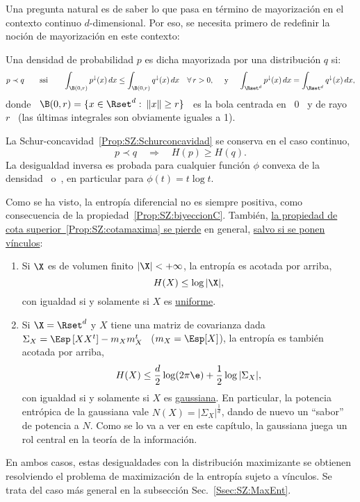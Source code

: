 Una pregunta natural  es de saber lo que pasa en  t\'ermino de mayorizaci\'on en
el contexto continuo $d$-dimensional. Por  eso, se necesita primero de redefinir
la noci\'on de mayorizaci\'on en este contexto:
%
\begin{definicion}\label{Def:SZ:MayorizacionC}
  Una densidad  de probabilidad $p$  es dicha mayorizada por  una distribuci\'on
  $q$ si:
  \[
  p \prec  q \qquad \mbox{ssi}  \qquad \int_{\B(0,r)} p^\downarrow(x) \,  dx \le
  \int_{\B(0,r)} q^\downarrow(x) \, dx \quad \forall  \, r > 0, \quad \mbox{ y }
  \quad \int_{\Rset^d} p^\downarrow(x) \, dx = \int_{\Rset^d} q^\downarrow(x) \,
  dx,
  \]
  donde \ $\B(0,r) = \{ x \in \Rset^d:  \: \|x\| \ge r \}$ \ es la bola centrada
  en \ $0$ \ y de rayo  \ $r$ \ (las \'ultimas integrales son obviamente iguales
  a 1).
\end{definicion}
%
\noindent  La Schur-concavidad~\ref{Prop:SZ:Schurconcavidad}  se conserva  en el
caso  continuo, \ie
%
\[
p \prec  q  \quad \Rightarrow  \quad H(p)  \ge H(q).
\]
%
La desigualdad inversa es probada  para cualquier funci\'on $\phi$ convexa de la
densidad~\cite{Cho74} o~\cite[Prop.~7.3]{WanMad04},  en particular para $\phi(t)
= t \log t$.

Como  se  ha visto,  la  entrop\'ia diferencial  no  es  siempre positiva,  como
consecuencia de la propiedad~\ref{Prop:SZ:biyeccionC}.  Tambi\'en, \underline{la
  propiedad  de cota  superior~\ref{Prop:SZ:cotamaxima} se  pierde}  en general,
\underline{salvo si se ponen v\'inculos}:
%
\begin{propiedadesC}\setcounter{enumi}{\value{PropCotamaxima}}
\item
  \begin{enumerate}
  \item\label{Prop:SZ:cotamaximauniforme} Si $\X$ es de volumen finito $|\X| < +
    \infty$, la entrop\'ia es acotada por arriba,
    \[
    H(X) \le \log |\X|,
    \]
    con igualdad si y solamente si $X$ es \underline{uniforme}.
  \item\label{Prop:SZ:cotamaximagaussiana}  Si  $\X =\Rset^d$  y  $X$ tiene  una
    matriz  de covarianza  dada \  $\Sigma_X =  \Esp\left[ X  X^t \right]  - m_X
    m_X^t$ \ ($m_X = \Esp[X]$), la entrop\'ia es tambi\'en acotada por arriba,
    \[
    H(X) \le \frac{d}{2} \log(2 \pi \e) + \frac12 \log |\Sigma_X|,
    \]
    con igualdad si y solamente si $X$ es \underline{gaussiana}.  En particular,
    la  potencia  entr\'opica de  la  gaussiana  vale  $N(X) =  \left|  \Sigma_X
    \right|^{\frac1d}$, dando de nuevo un  ``sabor'' de potencia a $N$.  Como se
    lo va  a ver en  este cap\'itulo,  la gaussiana juega  un rol central  en la
    teor\'ia de la informaci\'on.
  \end{enumerate}
  En  ambos casos,  estas  desigualdades con  la  distribuci\'on maximizante  se
  obtienen resolviendo el  problema de maximizaci\'on de la  entrop\'ia sujeto a
  v\'inculos.    Se  trata   del   caso  m\'as   general   en  la   subsecci\'on
  Sec.~\ref{Ssec:SZ:MaxEnt}.
\end{propiedadesC}

